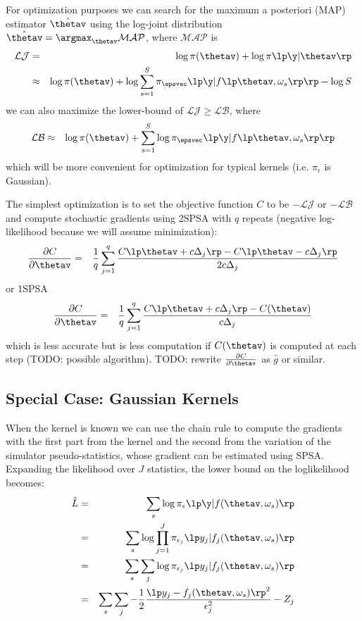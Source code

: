 For optimization purposes we can search for the maximum a posteriori (MAP) estimator $\hat{\thetav}$ using the log-joint distribution $\hat{\thetav} = \argmax_{\thetav} \mathcal{MAP}$, where $\mathcal{MAP}$ is
\begin{eqnarray}
  \mathcal{LJ} &    =    & \log \pi(\thetav) + \log \pi\lp \y | \thetav \rp \\
                & \approx &\log \pi(\thetav) + \log \sum_{s=1}^S \pi_{\epsvec}\lp \y | f\lp \thetav, \omega_s \rp \rp - \log S
\end{eqnarray} 
we can also maximize the lower-bound of $\mathcal{LJ} \geq \mathcal{LB}$, where 
\begin{eqnarray}
  \mathcal{LB} & \approx &\log \pi(\thetav) + \sum_{s=1}^S \log  \pi_{\epsvec}\lp \y | f\lp \thetav, \omega_s \rp \rp
\end{eqnarray} 
which will be more convenient for optimization for typical kernels (i.e. $\pi_{\epsilon}$ is Gaussian).

The simplest optimization is to set the objective function  $C$ to be $-\mathcal{LJ}$ or $-\mathcal{LB}$ and compute stochastic gradients using 2SPSA with $q$ repeats (negative log-likelihood because we will assume minimization):
\begin{eqnarray}
  \frac{\partial C}{\partial \thetav} & = & \frac{1}{q} \sum_{j=1}^{q} \frac{C\lp \thetav + c \Delta_j\rp - C{\lp\thetav - c \Delta_j\rp}}{2 c \Delta_j}
\end{eqnarray}
or 1SPSA
\begin{eqnarray}
  \frac{\partial C}{\partial \thetav} & = & \frac{1}{q} \sum_{j=1}^{q}  \frac{C\lp \thetav + c \Delta_j\rp - C(\thetav)}{c \Delta_j}
\end{eqnarray}
which is less accurate but is less computation if $C(\thetav)$ is computed at each step (TODO: possible algorithm).  TODO: rewrite $\frac{\partial C}{\partial \thetav}$ as $\hat{g}$ or similar.

\subsection{Special Case: Gaussian Kernels}
When the kernel is known we can use the chain rule to compute the gradients with the first part from the kernel and the second from the variation of the simulator pseudo-statistics, whose gradient can be estimated using SPSA.  Expanding the likelihood over $J$ statistics, the lower bound on the loglikelihood becomes:
\begin{eqnarray}
  \hat{L} & = & \sum_s \log \pi_{\epsilon}\lp \y | f(\thetav, \omega_s)\rp \\
          & = & \sum_s \log \prod_{j=1}^J \pi_{\epsilon_j}\lp y_j | f_j(\thetav, \omega_s)\rp \\
          & = & \sum_s \sum_j \log  \pi_{\epsilon_j}\lp y_j | f_j(\thetav, \omega_s)\rp \\
          & = & \sum_s \sum_j -\frac{1}{2} \frac{\lp y_j - f_j(\thetav, \omega_s)\rp^2}{\epsilon_j^2} - Z_j \\
\end{eqnarray}

